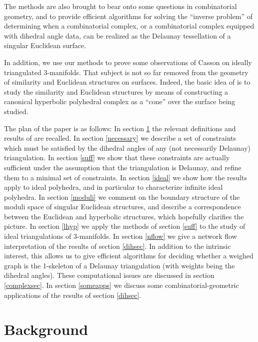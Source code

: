 \documentclass{acmart}
\begin{document}
The methods are also brought to bear onto some questions in
combinatorial geometry, and to provide efficient algorithms for
solving the ``inverse problem'' of determining when a combinatorial
complex, or a combinatorial complex equipped with dihedral angle data,
can be realized as the Delaunay tessellation of a singular Euclidean
surface. 

In addition, we use our methods to prove some observations of Casson
on ideally triangulated $3$-manifolds. That subject is not so far
removed from the geometry of similarity and Euclidean structures on
surfaces. Indeed, the basic idea of \cite{rvol} is to study the
similarity and Euclidean structures by means of constructing a
canonical hyperbolic polyhedral complex as a ``cone'' over the surface
being studied.

The plan of the paper is as follows: In section \ref{oldstuff}
the relevant definitions and results of \cite{rvol} are recalled. 
In section \ref{necessary} we describe a set of constraints which must
be satisfied by the dihedral angles of any (not necessarily Delaunay)
triangulation. In section \ref{suff} we show that these constraints
are actually sufficient under the assumption that the triangulation
is Delaunay, and refine them to a minimal set of constraints.  In
section \ref{ideal} we show how the results apply to 
ideal polyhedra, and in particular to characterize
infinite ideal polyhedra. In section \ref{moduli} we comment on the
boundary structure of the moduli space of singular Euclidean
structures, and describe a correspondence between the Euclidean and
hyperbolic structures, which hopefully clarifies the picture. 
In section \ref{lhyp} we
apply the methods of section \ref{suff} to the study of ideal
triangulations of $3$-manifolds. In section \ref{nflow} we give a
network flow interpretation of the results of section \ref{dihsec}. In
addition to the intrinsic interest, this allows us to give efficient
algorithms for deciding whether a weighed graph is the 1-skeleton of a
Delaunay triangulation (with weights being the dihedral angles). These
computational issues are discussed in section \ref{complexsec}. In
section \ref{someapps} we discuss some combinatorial-geometric
applications of the results of section \ref{dihsec}.

\section{Background}
\label{oldstuff}
\end{document}
